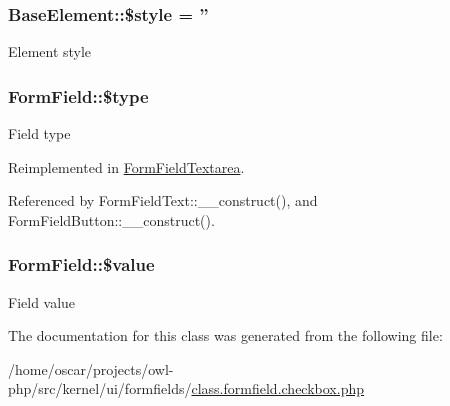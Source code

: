 \subsubsection[{\$style}]{\setlength{\rightskip}{0pt plus 5cm}BaseElement::\$style = ''}\label{classBaseElement_a429a3d642dd95f30e1059ef29564b87d}
Element style 
\subsubsection[{\$type}]{\setlength{\rightskip}{0pt plus 5cm}FormField::\$type}\label{classFormField_a37bed21a1891e95be0e4a697e45ba51b}
Field type 

Reimplemented in \hyperlink{classFormFieldTextarea_a85348034822c70694fc8640bfcacc04d}{FormFieldTextarea}.



Referenced by FormFieldText::\_\-\_\-construct(), and FormFieldButton::\_\-\_\-construct().

\subsubsection[{\$value}]{\setlength{\rightskip}{0pt plus 5cm}FormField::\$value}\label{classFormField_a3c01e89834248eec8e2f145fbcfa0fbc}
Field value 

The documentation for this class was generated from the following file:\begin{DoxyCompactItemize}
\item 
/home/oscar/projects/owl-\/php/src/kernel/ui/formfields/\hyperlink{class_8formfield_8checkbox_8php}{class.formfield.checkbox.php}\end{DoxyCompactItemize}

